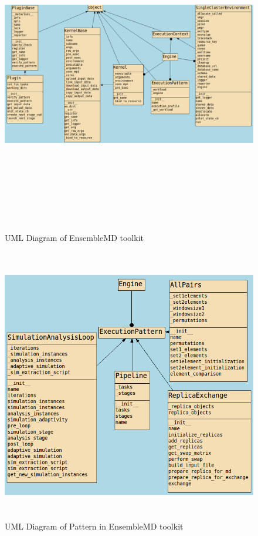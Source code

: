 \documentclass[10pt]{ruthesis}
\begin{document}
\begin{landscape}
\begin{figure}
  \centering
  \includegraphics[width=23cm,height=14cm]{complete1.png}
  \caption{UML Diagram of EnsembleMD toolkit}
  \label{fig:umlcomplete}
\end{figure}
\end{landscape}

\begin{figure}[h]
  \centering
  \includegraphics[width=15cm,height=12cm]{pattern.png}
  \caption{UML Diagram of Pattern in EnsembleMD toolkit}
  \label{fig:umlpattern}
\end{figure}
\end{document}
